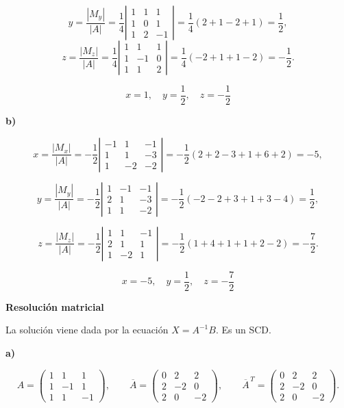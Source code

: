 \documentclass[a4paper,12pt]{article}
\begin{document}
\begin{ejercicio}[title=Ejercicio 25]
\[
y = \frac{|M_y|}{|A|}
= \frac{1}{4}
\left|
\begin{matrix}
1 & 1 & 1\\
1 & 0 & 1\\
1 & 2 & -1
\end{matrix}
\right|
= \frac{1}{4}(2+1-2+1) = \frac{1}{2},
\]
\[
z = \frac{|M_z|}{|A|}
= \frac{1}{4}
\left|
\begin{matrix}
1 & 1 & 1\\
1 & -1 & 0\\
1 & 1 & 2
\end{matrix}
\right|
= \frac{1}{4}(-2+1+1-2) = -\frac{1}{2}.
\]

\[
\boxed{\,x = 1,\quad y = \frac{1}{2},\quad z = -\frac{1}{2}\,}
\]

\bigskip

\textbf{b)}

\[
x = \frac{|M_x|}{|A|} = -\frac{1}{2}
\left|
\begin{matrix}
-1 & 1 & -1\\
1 & 1 & -3\\
1 & -2 & -2
\end{matrix}
\right|
= -\frac{1}{2}(2+2-3+1+6+2) = -5,
\]

\[
y = \frac{|M_y|}{|A|} = -\frac{1}{2}
\left|
\begin{matrix}
1 & -1 & -1\\
2 & 1 & -3\\
1 & 1 & -2
\end{matrix}
\right|
= -\frac{1}{2}(-2-2+3+1+3-4) = \frac{1}{2},
\]

\[
z = \frac{|M_z|}{|A|} = -\frac{1}{2}
\left|
\begin{matrix}
1 & 1 & -1\\
2 & 1 & 1\\
1 & -2 & 1
\end{matrix}
\right|
= -\frac{1}{2}(1+4+1+1+2-2) = -\frac{7}{2}.
\]

\[
\boxed{\,x = -5,\quad y = \frac{1}{2},\quad z = -\frac{7}{2}\,}
\]

\bigskip

\textbf{Resolución matricial}

La solución viene dada por la ecuación $X = A^{-1}B$. Es un SCD.

\textbf{a)}

\[
A =
\begin{pmatrix}
1 & 1 & 1\\
1 & -1 & 1\\
1 & 1 & -1
\end{pmatrix},
\qquad
\overline{A} =
\begin{pmatrix}
0 & 2 & 2\\
2 & -2 & 0\\
2 & 0 & -2
\end{pmatrix},
\qquad
\overline{A}^{\,T} =
\begin{pmatrix}
0 & 2 & 2\\
2 & -2 & 0\\
2 & 0 & -2
\end{pmatrix}.
\]


\end{ejercicio}
\end{document}
